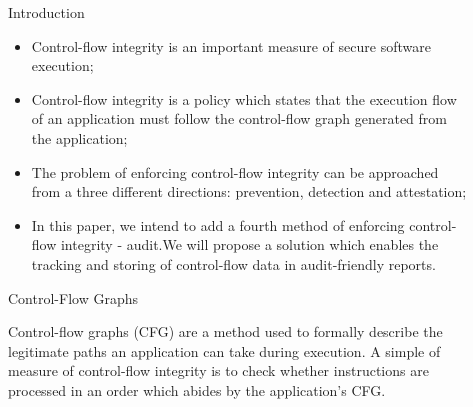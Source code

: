 \documentclass[final]{beamer}
\newlength{\sepwid}
\newlength{\onecolwid}
\newlength{\twocolwid}
\begin{document}
\begin{frame}[t]
\begin{columns}[t]
\begin{column}{\onecolwid}
\begin{block}{Introduction}
\begin{itemize}
	\item Control-flow integrity is an important measure of secure software execution; \vspace*{0.4cm}
	\item Control-flow integrity is a policy which states that the execution flow of an application must follow the control-flow graph generated from the application; \vspace*{0.4cm}
	\item The problem of enforcing control-flow integrity can be approached from a three different directions: prevention, detection and attestation; \vspace*{0.4cm}
	\item In this paper, we intend to add a fourth method of enforcing control-flow integrity - audit.We will propose a solution which enables the tracking and storing of control-flow data in audit-friendly reports.
\end{itemize}

\end{block}


\begin{block}{Control-Flow Graphs}

Control-flow graphs (CFG) are a method used to formally describe the legitimate paths an application can take during execution. A simple of measure of control-flow integrity is to check whether instructions are processed in an order which abides by the application's CFG.

\end{block}

\end{column} %


\begin{column}{\sepwid}\end{column} %

\begin{column}{\twocolwid} %


\end{column}
\end{columns}
\end{frame}
\end{document}
